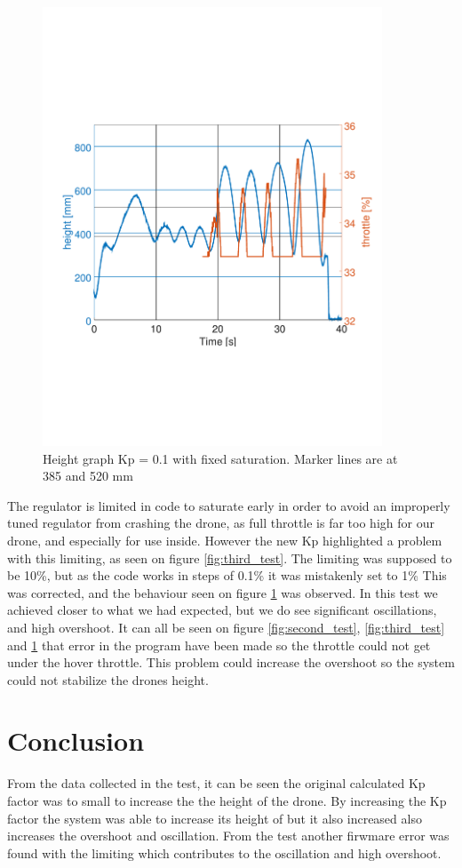 \begin{figure}[h]
    \centering
    \includegraphics[width=0.9\textwidth, trim={0 7cm 0 7cm},clip]{figures/Appendix/final_test/kp0,1fix.pdf}
    \caption{Height graph Kp = 0.1 with fixed saturation. Marker lines are at 385 and 520 mm}
    \label{fig:fourth_test}
\end{figure}


The regulator is limited in code to saturate early in order to avoid an improperly tuned regulator from crashing the drone, as full throttle is far too high for our drone, and especially for use inside. However the new Kp highlighted a problem with this limiting, as seen on figure \ref{fig:third_test}. The limiting was supposed to be 10\%, but as the code works in steps of 0.1\% it was mistakenly set to 1\% This was corrected, and the behaviour seen on figure \ref{fig:fourth_test} was observed. In this test we achieved closer to what we had expected, but we do see significant oscillations, and high overshoot.
It can all be seen on figure \ref{fig:second_test}, \ref{fig:third_test} and \ref{fig:fourth_test} that error in the program have been made so the throttle could not get under the hover throttle. This problem could increase the overshoot so the system could not stabilize the drones height.

\section*{Conclusion}
From the data collected in the test, it can be seen the original calculated Kp factor was to small to increase the the height of the drone. By increasing the Kp factor the system was able to increase its height of but it also increased also increases the overshoot and oscillation.
From the test another firwmare error was found with the limiting which contributes to the oscillation and high overshoot.